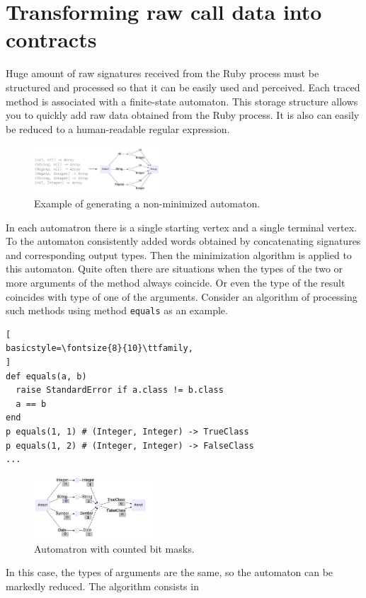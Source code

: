 \documentclass[conference]{IEEEtran}
\begin{document}
\section{Transforming raw call data into contracts}
Huge amount of raw signatures received from the Ruby process must be structured and processed so that it can be easily
used and perceived. Each traced method is associated with a finite-state automaton. This storage structure allows you to
quickly add raw data obtained from the Ruby process. It is also can easily be reduced to a human-readable regular
expression. 
\begin{figure}[h]
    \centering
    \includegraphics[width=0.42\textwidth]{img2}
    \caption{Example of generating a non-minimized automaton.}
\end{figure}
\newpage
In each automatron there is a single starting vertex and a single terminal vertex. To the automaton consistently added
words obtained by concatenating signatures and corresponding output types. Then the minimization
algorithm\cite{dfa_minimisation} is applied to this automaton. Quite often there are situations when the types of the
two or more arguments of the method always coincide. Or even the type of the result coincides with type of one of the
arguments. Consider an algorithm of processing such methods using method \texttt{equals} as an example.
\begin{lstlisting}[
basicstyle=\fontsize{8}{10}\ttfamily,
]
def equals(a, b)
  raise StandardError if a.class != b.class
  a == b
end
p equals(1, 1) # (Integer, Integer) -> TrueClass
p equals(1, 2) # (Integer, Integer) -> FalseClass
...
\end{lstlisting}
\begin{figure}[h]
    \centering
    \includegraphics[width=0.4\textwidth]{img4}
    \caption{Automatron with counted bit masks.}
\end{figure}
In this case, the types of arguments are the same, so the automaton can be markedly reduced. The algorithm consists in
\end{document}
